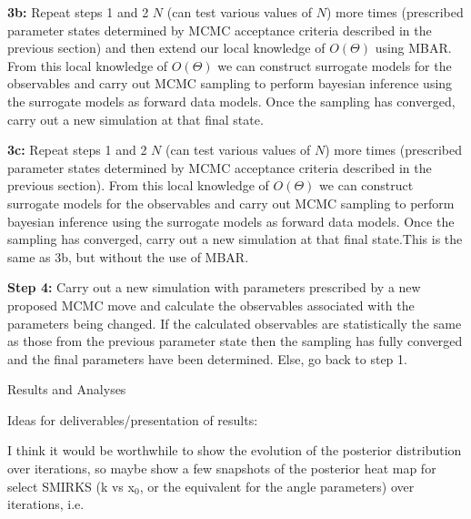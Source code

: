 \documentclass{report}
\begin{document}
\begin{outline}
\begin{outline}
\begin{outline}
\begin{outline}
\begin{outline}
\begin{outline}
            \item{\textbf{3b:} Repeat steps 1 and 2 $N$ (can test various values of $N$) more times (prescribed parameter states determined by MCMC acceptance criteria described in the previous section) and then extend 
                               our local knowledge of $O\left(\Theta\right)$ using MBAR. From this local knowledge of $O\left(\Theta\right)$ we can construct surrogate models for the observables and carry out MCMC sampling 
                               to perform bayesian inference using the surrogate models as forward data models. Once the sampling has converged, carry out a new simulation at that final state.}
            \item{\textbf{3c:} Repeat steps 1 and 2 $N$ (can test various values of $N$) more times (prescribed parameter states determined by MCMC acceptance criteria described in the previous section).
                               From this local knowledge of $O\left(\Theta\right)$ we can construct surrogate models for the observables and carry out MCMC sampling to perform bayesian inference using 
                               the surrogate models as forward data models. Once the sampling has converged, carry out a new simulation at that final state.This is the same as 3b, but without the use of MBAR.}
          \end{outline}
          \item{\textbf{Step 4:} Carry out a new simulation with parameters prescribed by a new proposed MCMC move and calculate the observables associated
                with the parameters being changed. If the calculated observables are statistically the same as those from the previous parameter state then
                the sampling has fully converged and the final parameters have been determined. Else, go back to step 1.}
        \end{outline}
      \end{outline}
    \end{outline}
  \end{outline} 
     
  \item{Results and Analyses}
  \begin{outline}
    \item{Ideas for deliverables/presentation of results:}
    \begin{outline}
      \item{I think it would be worthwhile to show the evolution of the posterior distribution over iterations, so maybe show a few snapshots of 
                the posterior heat map for select SMIRKS (k vs x$_0$, or the equivalent for the angle parameters) over iterations, i.e.  
      \begin{figure}[h!]
      \centering
  

\end{figure}}
\end{outline}
\end{outline}
\end{outline}
\end{document}
